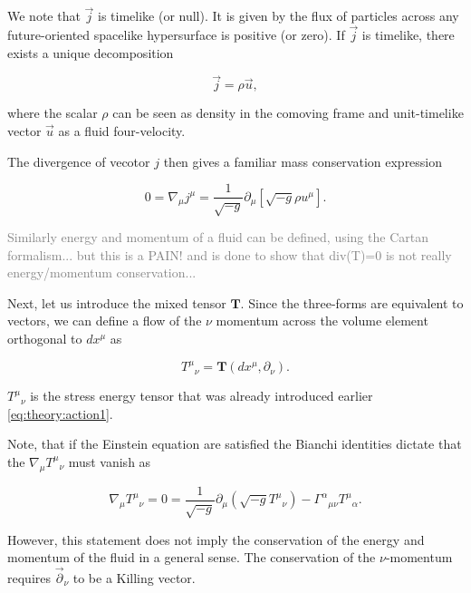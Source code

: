 We note that $\vec{j}$ is timelike (or null).
It is given by the flux of particles across any future-oriented spacelike hypersurface is positive (or zero). 
If $\vec{j}$ is timelike, there exists a unique decomposition 

\begin{equation}
\vec{j} = \rho \vec{u},
\label{eq:theory:defofjandu}
\end{equation}

where the scalar $\rho$ can be seen as density in the comoving frame and unit-timelike vector $\vec{u}$ as a fluid four-velocity.

The divergence of vecotor $j$ then gives a familiar mass conservation expression

\begin{equation}
0 = \nabla_{\mu} j^{\mu} = \frac{1}{\sqrt{-g}}\partial_{\mu}[\sqrt{-g}\rho u^{\mu}].
\label{eq:theory:nablamu_jmu}
\end{equation}

\textcolor{gray}{
    Similarly energy and momentum of a fluid can be defined, using the Cartan formalism... but this is a PAIN! and is done to show that div(T)=0 is not really energy/momentum conservation...
}

Next, let us introduce the mixed tensor $\boldsymbol{T}$. 
Since the three-forms are equivalent to vectors, we can define a flow of the $\nu$ momentum across the volume element orthogonal to $dx^{\mu}$ as 

\begin{equation}
{T^{\mu}}_{\nu}=\boldsymbol{T}(dx^{\mu},\partial_{\nu}).
\end{equation}

${T^{\mu}}_{\nu}$ is the stress energy tensor that was already introduced earlier \ref{eq:theory:action1}. 

Note, that if the Einstein equation are satisfied the Bianchi identities dictate that the $\nabla_{\mu}{T^{\mu}}_{\nu}$ must vanish as

\begin{equation}
\nabla_{\mu}{T^{\mu}}_{\nu} = 0= \frac{1}{\sqrt{-g}}\partial_{\mu}(\sqrt{-g}{T^{\mu}}_{\nu}) - {\Gamma^{\alpha}}_{\mu\nu}{T^{\mu}}_{\alpha}.
\label{eq:theory:nablamu_tmunu}
\end{equation}

However, this statement does not imply the conservation of the energy and momentum of the fluid in a general sense. 
The conservation of the $\nu$-momentum requires $\vec{\partial}_{\nu}$ to be a Killing vector.


